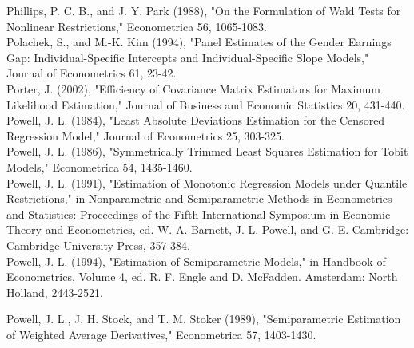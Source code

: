\documentclass[10pt]{article}
\begin{document}
Phillips, P. C. B., and J. Y. Park (1988), "On the Formulation of Wald Tests for Nonlinear Restrictions," Econometrica 56, 1065-1083.\\
Polachek, S., and M.-K. Kim (1994), "Panel Estimates of the Gender Earnings Gap: Individual-Specific Intercepts and Individual-Specific Slope Models," Journal of Econometrics 61, 23-42.\\
Porter, J. (2002), "Efficiency of Covariance Matrix Estimators for Maximum Likelihood Estimation," Journal of Business and Economic Statistics 20, 431-440.\\
Powell, J. L. (1984), "Least Absolute Deviations Estimation for the Censored Regression Model," Journal of Econometrics 25, 303-325.\\
Powell, J. L. (1986), "Symmetrically Trimmed Least Squares Estimation for Tobit Models," Econometrica 54, 1435-1460.\\
Powell, J. L. (1991), "Estimation of Monotonic Regression Models under Quantile Restrictions," in Nonparametric and Semiparametric Methods in Econometrics and Statistics: Proceedings of the Fifth International Symposium in Economic Theory and Econometrics, ed. W. A. Barnett, J. L. Powell, and G. E. Cambridge: Cambridge University Press, 357-384.\\
Powell, J. L. (1994), "Estimation of Semiparametric Models," in Handbook of Econometrics, Volume 4, ed. R. F. Engle and D. McFadden. Amsterdam: North Holland, 2443-2521.

Powell, J. L., J. H. Stock, and T. M. Stoker (1989), "Semiparametric Estimation of Weighted Average Derivatives," Econometrica 57, 1403-1430.
\end{document}
